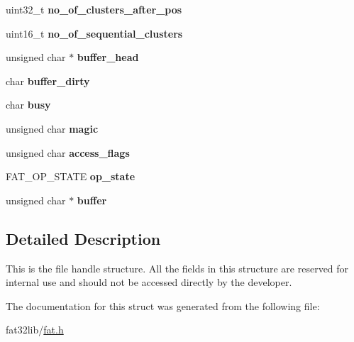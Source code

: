 \begin{DoxyCompactItemize}
\item 
\hypertarget{struct_f_a_t___f_i_l_e_a2a11d1d27c638cb1a6450794588ce202}{uint32\-\_\-t {\bfseries no\-\_\-of\-\_\-clusters\-\_\-after\-\_\-pos}}\label{struct_f_a_t___f_i_l_e_a2a11d1d27c638cb1a6450794588ce202}

\item 
\hypertarget{struct_f_a_t___f_i_l_e_a5329960566d00c1f3fb24de222ee3246}{uint16\-\_\-t {\bfseries no\-\_\-of\-\_\-sequential\-\_\-clusters}}\label{struct_f_a_t___f_i_l_e_a5329960566d00c1f3fb24de222ee3246}

\item 
\hypertarget{struct_f_a_t___f_i_l_e_af1b6645c5b37eafdae018f317d044712}{unsigned char $\ast$ {\bfseries buffer\-\_\-head}}\label{struct_f_a_t___f_i_l_e_af1b6645c5b37eafdae018f317d044712}

\item 
\hypertarget{struct_f_a_t___f_i_l_e_a02ba3079fec7de4f9e9f84da02b4b253}{char {\bfseries buffer\-\_\-dirty}}\label{struct_f_a_t___f_i_l_e_a02ba3079fec7de4f9e9f84da02b4b253}

\item 
\hypertarget{struct_f_a_t___f_i_l_e_ae5a0a546179a43c1a949e9fa93413419}{char {\bfseries busy}}\label{struct_f_a_t___f_i_l_e_ae5a0a546179a43c1a949e9fa93413419}

\item 
\hypertarget{struct_f_a_t___f_i_l_e_ab5d470cc959a2a367f045baedd54e0fb}{unsigned char {\bfseries magic}}\label{struct_f_a_t___f_i_l_e_ab5d470cc959a2a367f045baedd54e0fb}

\item 
\hypertarget{struct_f_a_t___f_i_l_e_a082dc4213953dc5456eca9abecb4d8da}{unsigned char {\bfseries access\-\_\-flags}}\label{struct_f_a_t___f_i_l_e_a082dc4213953dc5456eca9abecb4d8da}

\item 
\hypertarget{struct_f_a_t___f_i_l_e_a421f2c4ec089792a4d4ce30e396ea89d}{F\-A\-T\-\_\-\-O\-P\-\_\-\-S\-T\-A\-T\-E {\bfseries op\-\_\-state}}\label{struct_f_a_t___f_i_l_e_a421f2c4ec089792a4d4ce30e396ea89d}

\item 
\hypertarget{struct_f_a_t___f_i_l_e_a8eb89897f60885c592002dbf6f92219f}{unsigned char $\ast$ {\bfseries buffer}}\label{struct_f_a_t___f_i_l_e_a8eb89897f60885c592002dbf6f92219f}

\end{DoxyCompactItemize}


\subsection{Detailed Description}
This is the file handle structure. All the fields in this structure are reserved for internal use and should not be accessed directly by the developer. 

The documentation for this struct was generated from the following file\-:\begin{DoxyCompactItemize}
\item 
fat32lib/\hyperlink{fat_8h}{fat.\-h}\end{DoxyCompactItemize}

